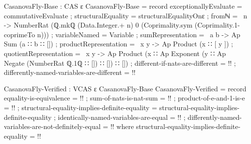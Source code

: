 \documentclass{report}
\begin{document}
\begin{code}
CasanovaFly-Base : CAS ε
CasanovaFly-Base = record
  { exceptionallyEvaluate = commutativeEvaluate
  ; structuralEquality = structuralEqualityOnε
  ; fromℕ = \ n ->
      NumberRat (ℚ.mkℚ (Data.Integer.+ n)
                       0
                       (Coprimality.sym (Coprimality.1-coprimeTo n)))
  ; variableNamed = Variable
  ; sumRepresentation = \ a b -> Ap Sum (a ∷ b ∷ [])
  ; productRepresentation = \ x y -> Ap Product (x ∷ [ y ])
  ; quotientRepresentation = \ x y ->
     Ap Product (x ∷ Ap Exponent (y ∷ Ap Negate (NumberRat ℚ.1ℚ ∷ []) ∷ []) ∷ [])
  ; different-if-nats-are-different = {!!}
  ; differently-named-variables-are-different = {!!}
  }

CasanovaFly-Verified : VCAS ε CasanovaFly-Base
CasanovaFly-Verified = record
  { equality-is-equivalence = {!!}
  ; sum-of-nats-is-nat-sum = {!!}
  ; product-of-e-and-1-is-e = {!!}
  ; structural-equality-implies-definite-equality =
    structural-equality-implies-definite-equality
  ; identically-named-variables-are-equal = {!!}
  ; differently-named-variables-are-not-definitely-equal = {!!}
  }
  where
  structural-equality-implies-definite-equality =
    {!!}
\end{code}
\end{document}
